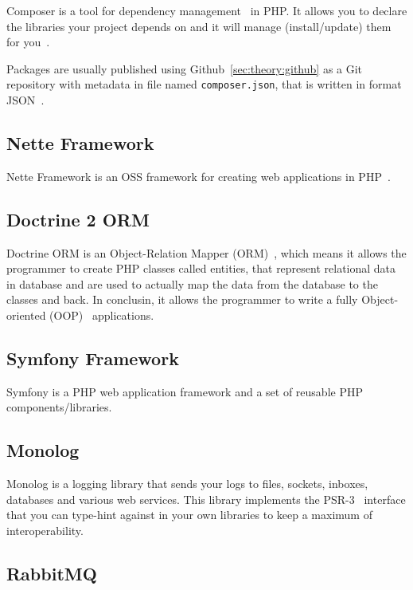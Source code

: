 Composer is a tool for dependency management~\cite{wiki:package-manager} in PHP. It allows you to declare the libraries your project depends on and it will manage (install/update) them for you~\cite{composer:docs:intro}.

Packages are usually published using Github~\ref{sec:theory:github} as a Git~\cite{wiki:git} repository with metadata in file named \lstinline{composer.json}, that is written in format JSON~\cite{wiki:json}.

\subsection{Nette Framework} \label{sec:theory:nette}

Nette Framework is an OSS framework for creating web applications in PHP~\cite{wiki:nette}.

\subsection{Doctrine 2 ORM} \label{sec:theory:doctrine}

Doctrine ORM is an Object-Relation Mapper (ORM)~\cite{wiki:orm}, which means it allows the programmer to create PHP classes called entities, that represent relational data in database and are used to actually map the data from the database to the classes and back. In conclusin, it allows the programmer to write a fully Object-oriented (OOP)~\cite{wiki:oop} applications.

\subsection{Symfony Framework} \label{sec:theory:symfony}

Symfony is a PHP web application framework and a set of reusable PHP components/libraries.~\cite{wiki:symfony}

\subsection{Monolog} \label{sec:theory:monolog}

Monolog is a logging library that sends your logs to files, sockets, inboxes, databases and various web services. This library implements the PSR-3~\cite{fig:psr} interface that you can type-hint against in your own libraries to keep a maximum of interoperability.~\cite{monolog:readme}

\subsection{RabbitMQ} \label{sec:theory:rabbitmq}

